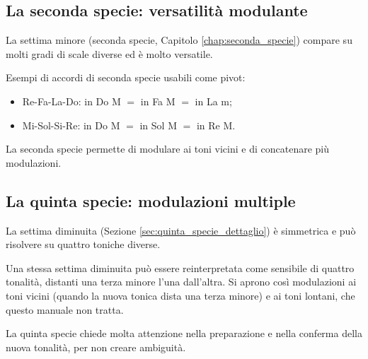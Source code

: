 \subsection{La seconda specie: versatilità modulante}
\label{subsec:seconda_specie_pivot}

La settima minore (seconda specie, Capitolo \ref{chap:seconda_specie}) compare su molti gradi di scale diverse ed è molto versatile.

\begin{regola}
	\label{reg:seconda_specie_pivot}
	Esempi di accordi di seconda specie usabili come pivot:
	\begin{itemize}
		\item Re-Fa-La-Do:  in Do M $=$  in Fa M $=$  in La m;
		\item Mi-Sol-Si-Re:  in Do M $=$  in Sol M $=$  in Re M.
	\end{itemize}
	La seconda specie permette di modulare ai toni vicini e di concatenare più modulazioni.
\end{regola}

\begin{esempio}[Modulazione Do M $\rightarrow$ Fa M con \sigla{II}{7}{} $=$ \sigla{VI}{7}{}]
	\label{ex:mod_seconda_specie}
\end{esempio}

\subsection{La quinta specie: modulazioni multiple}
\label{subsec:quinta_specie_modulazione}

La settima diminuita (Sezione \ref{sec:quinta_specie_dettaglio}) è simmetrica e può risolvere su quattro toniche diverse.

\begin{regola}
	\label{reg:quinta_specie_modulazioni}
	Una stessa settima diminuita può essere reinterpretata come sensibile di quattro tonalità, distanti una terza minore l'una dall'altra. Si aprono così modulazioni ai toni vicini (quando la nuova tonica dista una terza minore) e ai toni lontani, che questo manuale non tratta.
\end{regola}

La quinta specie chiede molta attenzione nella preparazione e nella conferma della nuova tonalità, per non creare ambiguità.


